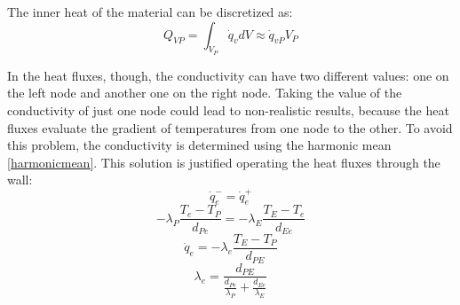 The inner heat of the material can be discretized as:
\begin{equation}
Q_{VP}=\int_{V_{P}}^{}\dot{q}_{v}dV\approx\dot{q}_{vP}V_{P}
\end{equation}

In the heat fluxes, though, the conductivity can have two different values: one on the left node and another one on the right node. Taking the value of the conductivity of just one node could lead to non-realistic results, because the heat fluxes evaluate the gradient of temperatures from one node to the other. To avoid this problem, the conductivity is determined using the harmonic mean \ref{harmonicmean}. This solution is justified operating the heat fluxes through the wall:
\begin{equation}
\dot{q}_{e}^{-}=\dot{q}_{e}^{+}
\end{equation}
\begin{equation}
-\lambda_{P}\frac{T_{e}-T_{P}}{d_{Pe}}=-\lambda_{E}\frac{T_{E}-T_{e}}{d_{Ee}}
\end{equation}
\begin{equation}
\dot{q}_{e}=-\lambda_{e}\frac{T_{E}-T_{P}}{d_{PE}}
\end{equation}
\begin{equation}
\lambda_{e}=\frac{d_{PE}}{\frac{d_{Pe}}{\lambda_{P}}+\frac{d_{Ee}}{\lambda_{E}}}
\label{harmonicmean}
\end{equation}

